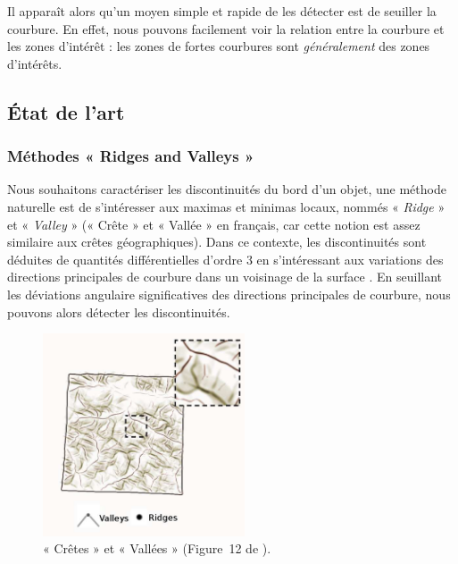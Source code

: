 Il apparaît alors qu'un moyen simple et rapide de les détecter est de seuiller
la courbure. En effet, nous pouvons facilement voir la relation entre la
courbure et les zones d’intérêt : les zones de fortes courbures sont
\emph{généralement} des zones d’intérêts.



\subsection{État de l'art}
\label{sec:applications:feature:SOTA}

\subsubsection{Méthodes « Ridges and Valleys »}
\label{sec:applications:feature:ridge}

Nous souhaitons caractériser les discontinuités du bord d'un objet, une méthode
naturelle est de s'intéresser aux maximas et minimas locaux, nommés \respp «
\emph{Ridge} » et « \emph{Valley} » (« Crête » et « Vallée » en français, car
cette notion est assez similaire aux crêtes géographiques). Dans ce contexte,
les discontinuités sont déduites de quantités différentielles d'ordre $3$ en
s'intéressant aux variations des directions principales de courbure dans un
voisinage de la surface \cite{Lai2007,Yang2006}. En seuillant les déviations
angulaire significatives des directions principales de courbure, nous pouvons
alors détecter les discontinuités.

\begin{figure}[ht]{
    \begin{center}
    \includegraphics[height=6cm]{images/Feature/RidgesValleys}
    \end{center}}
    \caption[Notations.]{« Crêtes » et « Vallées » (Figure~12 de \cite{Vergne2011}).
      \label{fig:ridges-valleys}}
\end{figure}

